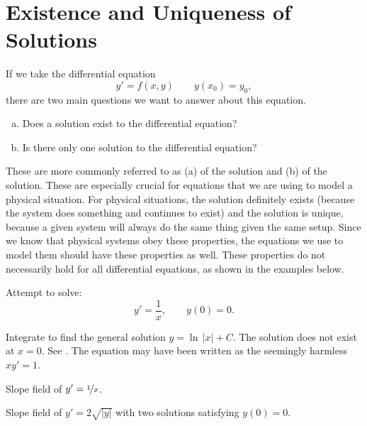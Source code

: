 \section{Existence and Uniqueness of Solutions}
\label{existunique:section}




If we take the differential equation
\[ y' = f(x,y) \qquad y(x_0) = y_0, \] there are two main questions we want to answer about this equation.
\begin{enumerate}[(a)]
\item Does a solution exist to the differential equation?
\item Is there only one solution to the differential equation?
\end{enumerate}

These are more commonly referred to as (a)  of the solution and (b)  of the solution. These are especially crucial for equations that we are using to model a physical situation. For physical situations, the solution definitely exists (because the system does something and continues to exist) and the solution is unique, because a given system will always do the same thing given the same setup. Since we know that physical systems obey these properties, the equations we use to model them should have these properties as well. These properties do not necessarily hold for all differential equations, as shown in the examples below. 

\begin{example}
Attempt to solve:
\begin{equation*}
y' = \frac{1}{x}, \qquad y(0) = 0 .
\end{equation*}

Integrate to find the general solution $y = \ln \, \lvert x \rvert + C$.  The
solution does not exist at $x=0$.  See .
The equation may have been written as the seemingly harmless $x y' = 1$.

\begin{myfig}
\parbox[t]{3in}{
 \capstart
 \caption{Slope field of $y' = \nicefrac{1}{x}$.\label{1.3:xinvfig}}
}
\quad
\parbox[t]{3in}{
 \capstart
 \caption{Slope field of $y' = 2 \sqrt{\lvert y \rvert}$ with two
 solutions satisfying $y(0) = 0$.\label{1.3:sqrtfig}}
}
\end{myfig}
\end{example}

